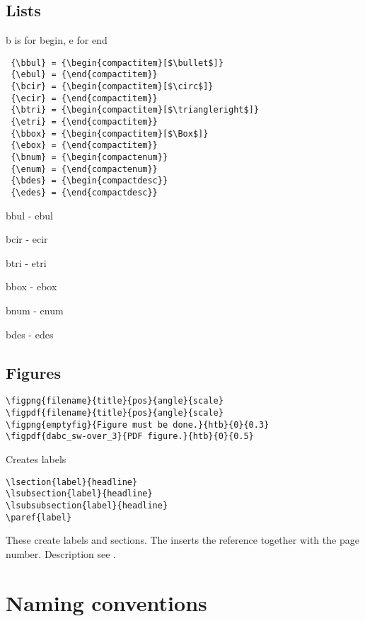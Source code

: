\subsection{Lists}
b is for begin, e for end
\begin{verbatim}
 {\bbul} = {\begin{compactitem}[$\bullet$]}
 {\ebul} = {\end{compactitem}}
 {\bcir} = {\begin{compactitem}[$\circ$]}
 {\ecir} = {\end{compactitem}}
 {\btri} = {\begin{compactitem}[$\triangleright$]}
 {\etri} = {\end{compactitem}}
 {\bbox} = {\begin{compactitem}[$\Box$]}
 {\ebox} = {\end{compactitem}}
 {\bnum} = {\begin{compactenum}}
 {\enum} = {\end{compactenum}}
 {\bdes} = {\begin{compactdesc}}
 {\edes} = {\end{compactdesc}}
\end{verbatim}
\bbul
\item bbul - ebul
\ebul
\bcir
\item bcir - ecir
\ecir
\btri
\item btri - etri
\etri
\bbox
\item bbox - ebox
\ebox
\bnum
\item bnum - enum
\enum
\bdes
\item[item] bdes - edes
\edes
\clearpage
\subsection{Figures}
\begin{verbatim}
\figpng{filename}{title}{pos}{angle}{scale}
\figpdf{filename}{title}{pos}{angle}{scale}
\figpng{emptyfig}{Figure must be done.}{htb}{0}{0.3}
\figpdf{dabc_sw-over_3}{PDF figure.}{htb}{0}{0.5}
\end{verbatim}
Creates labels 
\begin{verbatim}
\lsection{label}{headline}
\lsubsection{label}{headline}
\lsubsubsection{label}{headline}
\paref{label}
\end{verbatim}
These create labels and sections. The 
inserts the reference together with the page number.
Description see .
\section{Naming conventions}
